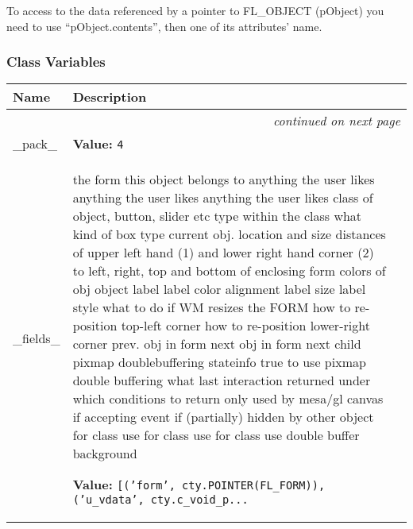 To access to the data referenced by a pointer to FL\_OBJECT (pObject) you
need to use ``pObject.contents'', then one of its attributes' name.


  \subsubsection{Class Variables}

    \vspace{-1cm}
\hspace{\varindent}\begin{longtable}{|p{\varnamewidth}|p{\vardescrwidth}|l}
\cline{1-2}
\cline{1-2} \centering \textbf{Name} & \centering \textbf{Description}& \\
\cline{1-2}
\endhead\cline{1-2}\multicolumn{3}{r}{\small\textit{continued on next page}}\\\endfoot\cline{1-2}
\endlastfoot\raggedright \_\-p\-a\-c\-k\-\_\- & \raggedright \textbf{Value:} 
{\tt 4}&\\
\cline{1-2}
\raggedright \_\-f\-i\-e\-l\-d\-s\-\_\- & \raggedright the form this object belongs to
anything the user likes
anything the user likes
anything the user likes
class of object, button, slider etc
type within the class
what kind of box type
current obj. location and size
distances of upper left hand (1) and
lower right hand corner (2) to left,
right, top and bottom of enclosing
form
colors of obj
object label
label color
alignment
label size
label style
what to do if WM resizes the FORM
how to re-position top-left corner
how to re-position lower-right corner
prev. obj in form
next obj in form
next child
pixmap doublebuffering stateinfo
true to use pixmap double buffering
what last interaction returned
under which conditions to return
only used by mesa/gl canvas
if accepting event
if (partially) hidden by other object
for class use
for class use
for class use
double buffer background

\textbf{Value:} 
{\tt [('form', cty.POINTER(FL\_FORM)), ('u\_vdata', cty.c\_void\_p\texttt{...}}&\\
\cline{1-2}
\end{longtable}


